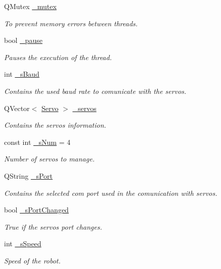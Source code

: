 \begin{DoxyCompactItemize}
Q\+Mutex \hyperlink{a00008_a6327eafc0dac189ec1b202d63ef32457}{\+\_\+mutex}
\begin{DoxyCompactList}\small\item\em To prevent memory errors between threads. \end{DoxyCompactList}\item 
bool \hyperlink{a00008_aaf2ef80e8e43518b75d20a5102970d2e}{\+\_\+pause}
\begin{DoxyCompactList}\small\item\em Pauses the execution of the thread. \end{DoxyCompactList}\item 
int \hyperlink{a00008_a5b9a41b9e271275b914affb0a845a2ee}{\+\_\+s\+Baud}
\begin{DoxyCompactList}\small\item\em Contains the used baud rate to comunicate with the servos. \end{DoxyCompactList}\item 
Q\+Vector$<$ \hyperlink{a00007}{Servo} $>$ \hyperlink{a00008_a1ac6662fe6d198b5971ae0ffa7ddfcfd}{\+\_\+servos}
\begin{DoxyCompactList}\small\item\em Contains the servos information. \end{DoxyCompactList}\item 
const int \hyperlink{a00008_a334e0c5bca9ccb2585cb82bce60ea42f}{\+\_\+s\+Num} = 4
\begin{DoxyCompactList}\small\item\em Number of servos to manage. \end{DoxyCompactList}\item 
Q\+String \hyperlink{a00008_ac9a614aa1518efb49b0a06636bd1bdbf}{\+\_\+s\+Port}
\begin{DoxyCompactList}\small\item\em Contains the selected com port used in the comunication with servos. \end{DoxyCompactList}\item 
bool \hyperlink{a00008_a6e803432db01b10ed975132315280fd3}{\+\_\+s\+Port\+Changed}
\begin{DoxyCompactList}\small\item\em True if the servos port changes. \end{DoxyCompactList}\item 
int \hyperlink{a00008_acbcc5de85714af781eef3abb08087cf7}{\+\_\+s\+Speed}
\begin{DoxyCompactList}\small\item\em Speed of the robot. \end{DoxyCompactList}\end{DoxyCompactItemize}


